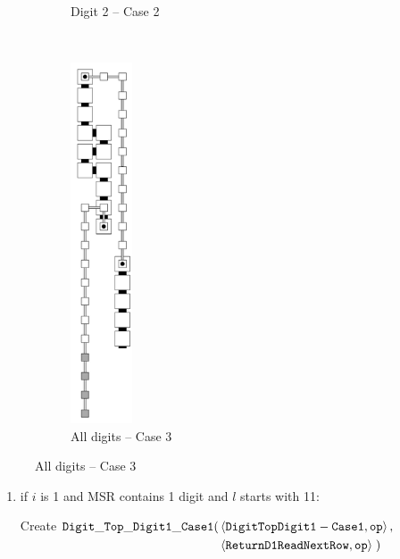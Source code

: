 \begin{itemize}
\begin{figure}[H]
\begin{subfigure}[t]{0.2\textwidth}
                    \caption{\label{fig:digit_tops/digit_top_case2_digit2_msr} Digit 2 -- Case 2}
                \end{subfigure}%
                ~
                \begin{subfigure}[t]{0.2\textwidth}
                    \centering
                    \includegraphics[width=0.2\textwidth]{digit_tops/digit_top_case3_msr}
                    \caption{\label{fig:digit_tops/digit_top_case3_msr} All digits -- Case 3}
                \end{subfigure}%
            \end{figure}


            \begin{enumerate}[label=\alph*)]
                \item if $i$ is 1 and MSR contains 1 digit and $l$ starts with 11:

                Create
                $\begin{aligned}[t]
                    {\tt Digit\_Top\_Digit1\_Case1}(& \left \langle {\tt DigitTopDigit1-Case1}, {\tt op} \right\rangle, & \\
                                     & \left \langle {\tt ReturnD1ReadNextRow},  {\tt op} \right\rangle \;)
                \end{aligned}$
                \vspace{.5cm}



\end{enumerate}
\end{itemize}
